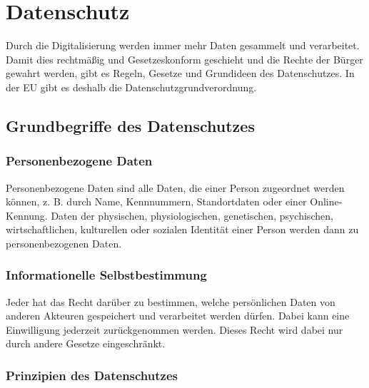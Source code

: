 \section{Datenschutz}

Durch die Digitalisierung werden immer mehr Daten gesammelt und verarbeitet.
Damit dies rechtmäßig und Gesetzeskonform geschieht und die Rechte der Bürger
gewahrt werden, gibt es Regeln, Gesetze und Grundideen des Datenschutzes.
In der EU gibt es deshalb die Datenschutzgrundverordnung.

\subsection{Grundbegriffe des Datenschutzes}

\subsubsection{Personenbezogene Daten}

Personenbezogene Daten sind alle Daten, die einer Person zugeordnet werden können,
z. B. durch Name, Kennnummern, Standortdaten oder einer Online-Kennung.
Daten der physischen, physiologischen, genetischen, psychischen, wirtschaftlichen,
kulturellen oder sozialen Identität einer Person werden dann zu personenbezogenen Daten.

\subsubsection{Informationelle Selbstbestimmung}

Jeder hat das Recht darüber zu bestimmen, welche persönlichen Daten von anderen Akteuren
gespeichert und verarbeitet werden dürfen. Dabei kann eine Einwilligung jederzeit
zurückgenommen werden. Dieses Recht wird dabei nur durch andere Gesetze eingeschränkt.

\subsubsection{Prinzipien des Datenschutzes}

